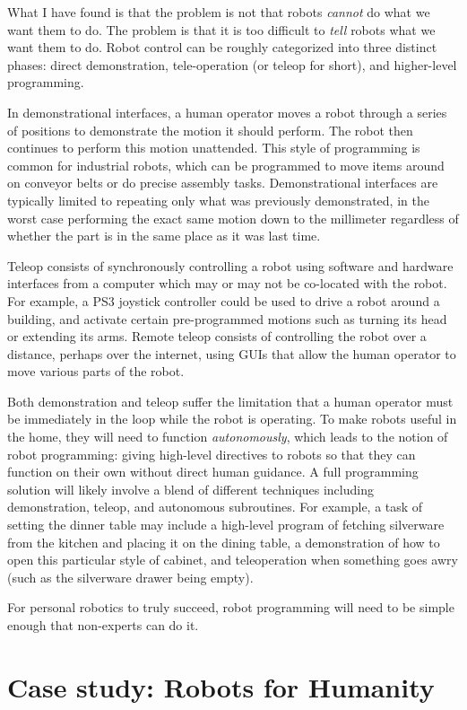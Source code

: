\documentclass[11pt,twocolumn]{article}
\begin{document}
What I have found is that the problem is not that robots {\em cannot} do what we want them to do. The problem is that it is too difficult to {\em tell} robots what we want them to do. Robot control can be roughly categorized into three distinct phases: direct demonstration, tele-operation (or teleop for short), and higher-level programming.

In demonstrational interfaces, a human operator moves a robot through a series of positions to demonstrate the motion it should perform. The robot then continues to perform this motion unattended. This style of programming is common for industrial robots, which can be programmed to move items around on conveyor belts or do precise assembly tasks. Demonstrational interfaces are typically limited to repeating only what was previously demonstrated, in the worst case performing the exact same motion down to the millimeter regardless of whether the part is in the same place as it was last time.

Teleop consists of synchronously controlling a robot using software and hardware interfaces from a computer which may or may not be co-located with the robot. For example, a PS3 joystick controller could be used to drive a robot around a building, and activate certain pre-programmed motions such as turning its head or extending its arms. Remote teleop consists of controlling the robot over a distance, perhaps over the internet, using GUIs that allow the human operator to move various parts of the robot.

Both demonstration and teleop suffer the limitation that a human operator must be immediately in the loop while the robot is operating. To make robots useful in the home, they will need to function {\em autonomously}, which leads to the notion of robot programming: giving high-level directives to robots so that they can function on their own without direct human guidance.  A full programming solution will likely involve a blend of different techniques including demonstration, teleop, and autonomous subroutines. For example, a task of setting the dinner table may include a high-level program of fetching silverware from the kitchen and placing it on the dining table, a demonstration of how to open this particular style of cabinet, and teleoperation when something goes awry (such as the silverware drawer being empty).

For personal robotics to truly succeed, robot programming will need to be simple enough that non-experts can do it.

\section{Case study: Robots for Humanity}
\end{document}
